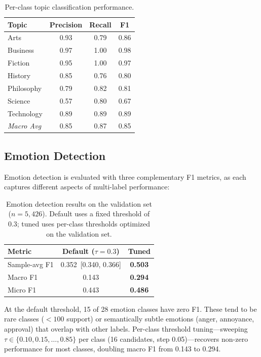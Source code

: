 \documentclass[11pt,a4paper]{article}
\begin{document}
\begin{table}[t]
\centering
\caption{Per-class topic classification performance.}
\label{tab:topic_breakdown}
\begin{tabular}{lccc}
\toprule
\textbf{Topic} & \textbf{Precision} & \textbf{Recall} & \textbf{F1} \\
\midrule
Arts & 0.93 & 0.79 & 0.86 \\
Business & 0.97 & 1.00 & 0.98 \\
Fiction & 0.95 & 1.00 & 0.97 \\
History & 0.85 & 0.76 & 0.80 \\
Philosophy & 0.79 & 0.82 & 0.81 \\
Science & 0.57 & 0.80 & 0.67 \\
Technology & 0.89 & 0.89 & 0.89 \\
\midrule
\textit{Macro Avg} & 0.85 & 0.87 & 0.85 \\
\bottomrule
\end{tabular}
\end{table}

\subsection{Emotion Detection}

Emotion detection is evaluated with three complementary F1 metrics, as each captures different aspects of multi-label performance:

\begin{table}[t]
\centering
\caption{Emotion detection results on the validation set ($n = 5{,}426$). Default uses a fixed threshold of 0.3; tuned uses per-class thresholds optimized on the validation set.}
\label{tab:emotion_results}
\begin{tabular}{lcc}
\toprule
\textbf{Metric} & \textbf{Default ($\tau=0.3$)} & \textbf{Tuned} \\
\midrule
Sample-avg F1 & 0.352~{\scriptsize[0.340, 0.366]} & \textbf{0.503} \\
Macro F1 & 0.143 & \textbf{0.294} \\
Micro F1 & 0.443 & \textbf{0.486} \\
\bottomrule
\end{tabular}
\end{table}

At the default threshold, 15 of 28 emotion classes have zero F1.
These tend to be rare classes ($< 100$ support) or semantically subtle emotions (anger, annoyance, approval) that overlap with other labels.
Per-class threshold tuning---sweeping $\tau \in \{0.10, 0.15, \ldots, 0.85\}$ per class (16 candidates, step 0.05)---recovers non-zero performance for most classes, doubling macro F1 from 0.143 to 0.294.
\end{document}
